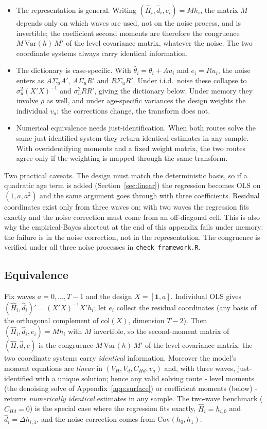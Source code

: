 \documentclass[11pt]{article}
\theoremstyle{remark}
\newcommand{\Var}{\mathrm{Var}}
\newcommand{\Cov}{\mathrm{Cov}}
\begin{document}
\begin{itemize}
\item The representation is general.
Writing $(\hat H_i,\hat d_i,e_i)=M h_i$, the matrix $M$ depends only on which waves are used, not on the noise process, and is invertible; the coefficient second moments are therefore the congruence $M\,\Var(h)\,M'$ of the level covariance matrix, whatever the noise.
The two coordinate systems always carry identical information.
\item The dictionary is case-specific.
With $\hat\theta_i=\theta_i+Au_i$ and $e_i=Ru_i$, the noise enters as $A\Sigma_uA'$, $A\Sigma_uR'$ and $R\Sigma_uR'$.
Under i.i.d.\ noise these collapse to $\sigma^2_u(X'X)^{-1}$ and $\sigma^2_uRR'$, giving the dictionary below.
Under memory they involve $\rho$ as well, and under age-specific variances the design weights the individual $v_a$: the corrections change, the transform does not.
\item Numerical equivalence needs just-identification.
When both routes solve the same just-identified system they return identical estimates in any sample.
With overidentifying moments and a fixed weight matrix, the two routes agree only if the weighting is mapped through the same transform.
\end{itemize}

Two practical caveats.
The design must match the deterministic basis, so if a quadratic age term is added (Section~\ref{sec:linear}) the regression becomes OLS on $(1,a,a^2)$ and the same argument goes through with three coefficients.
Residual coordinates exist only from three waves on; with two waves the regression fits exactly and the noise correction must come from an off-diagonal cell.
This is also why the empirical-Bayes shortcut at the end of this appendix fails under memory: the failure is in the noise correction, not in the representation.
The congruence is verified under all three noise processes in \texttt{check\_framework.R}.

\subsection*{Equivalence}
Fix waves $a=0,\dots,T-1$ and the design $X=[\mathbf{1},a]$.
Individual OLS gives $(\hat H_i,\hat d_i)'=(X'X)^{-1}X'h_i$; let $e_i$ collect the residual coordinates (any basis of the orthogonal complement of $\mathrm{col}(X)$, dimension $T-2$).
Then $(\hat H_i,\hat d_i,e_i)=M h_i$ with $M$ invertible, so the second-moment matrix of $(\hat H,\hat d,e)$ is the congruence $M\,\Var(h)\,M'$ of the level covariance matrix: the two coordinate systems carry \emph{identical} information.
Moreover the model's moment equations are \emph{linear} in $(V_H,V_d,C_{Hd},v_a)$ and, with three waves, just-identified with a unique solution; hence any valid solving route - level moments (the denoising solve of Appendix~\ref{app:surface}) or coefficient moments (below) - returns \emph{numerically identical} estimates in any sample.
The two-wave benchmark ($C_{Hd}=0$) is the special case where the regression fits exactly, $\hat H_i=h_{i,0}$ and $\hat d_i=\Delta h_{i,1}$, and the noise correction comes from $\Cov(h_0,h_1)$.
\end{document}
